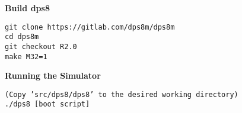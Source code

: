 \textbf{Build dps8}

\begin{adjustwidth}{5ex}{1ex}
    \texttt{git clone https://gitlab.com/dps8m/dps8m} \\
    \texttt{cd dps8m} \\
    \texttt{git checkout R2.0} \\
    \texttt{make M32=1} \\
\end{adjustwidth}

\textbf{Running the Simulator}

\begin{adjustwidth}{5ex}{1ex}
    \texttt{(Copy 'src/dps8/dps8' to the desired working directory)} \\
    \texttt{./dps8 [boot script]} \\
\end{adjustwidth}

